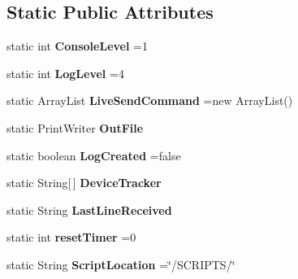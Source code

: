\subsection*{Static Public Attributes}
\begin{DoxyCompactItemize}
\item 
\hypertarget{classCASUAL_1_1Statics_a38ffcb67f410b0b445e8f121fa65a2a0}{static int {\bfseries Console\-Level} =1}\label{classCASUAL_1_1Statics_a38ffcb67f410b0b445e8f121fa65a2a0}

\item 
\hypertarget{classCASUAL_1_1Statics_a24af820d28b28e0da05d9c1339a6ddd4}{static int {\bfseries Log\-Level} =4}\label{classCASUAL_1_1Statics_a24af820d28b28e0da05d9c1339a6ddd4}

\item 
\hypertarget{classCASUAL_1_1Statics_a4b2e2bdefdbbeaeb34cdd906552ca233}{static Array\-List {\bfseries Live\-Send\-Command} =new Array\-List()}\label{classCASUAL_1_1Statics_a4b2e2bdefdbbeaeb34cdd906552ca233}

\item 
\hypertarget{classCASUAL_1_1Statics_aeab8c73f96ce6a81ee1696f7b93ab771}{static Print\-Writer {\bfseries Out\-File}}\label{classCASUAL_1_1Statics_aeab8c73f96ce6a81ee1696f7b93ab771}

\item 
\hypertarget{classCASUAL_1_1Statics_afcb91a9ed5601a77aa93089eadb7204a}{static boolean {\bfseries Log\-Created} =false}\label{classCASUAL_1_1Statics_afcb91a9ed5601a77aa93089eadb7204a}

\item 
\hypertarget{classCASUAL_1_1Statics_a05039e78983cf99e6d16809d720f74c5}{static String\mbox{[}$\,$\mbox{]} {\bfseries Device\-Tracker}}\label{classCASUAL_1_1Statics_a05039e78983cf99e6d16809d720f74c5}

\item 
\hypertarget{classCASUAL_1_1Statics_a607b50419232b757b01f4fdcb15613d6}{static String {\bfseries Last\-Line\-Received}}\label{classCASUAL_1_1Statics_a607b50419232b757b01f4fdcb15613d6}

\item 
\hypertarget{classCASUAL_1_1Statics_a5f9c31bef96416b9acf739e538032b01}{static int {\bfseries reset\-Timer} =0}\label{classCASUAL_1_1Statics_a5f9c31bef96416b9acf739e538032b01}

\item 
\hypertarget{classCASUAL_1_1Statics_ab49b319182ac363c28fe3b8a86231e32}{static String {\bfseries Script\-Location} =\char`\"{}/S\-C\-R\-I\-P\-T\-S/\char`\"{}}\label{classCASUAL_1_1Statics_ab49b319182ac363c28fe3b8a86231e32}


\end{DoxyCompactItemize}
